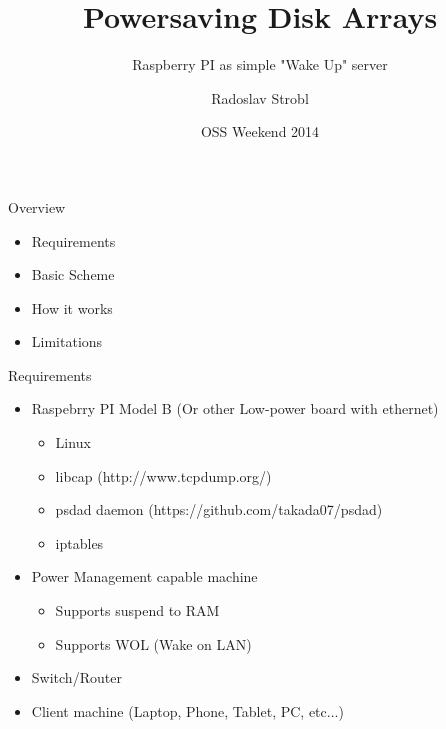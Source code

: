 \documentclass{beamer}
\title{Powersaving Disk Arrays}
\subtitle{Raspberry PI as simple "Wake Up" server}
\date[2014]{OSS Weekend 2014}
\author[R. Strobl]{Radoslav Strobl}
\begin{document}
\frame{\maketitle} %

\begin{frame}{Overview}
    \begin{itemize}
        \vfill\item Requirements
        \vfill\item Basic Scheme
        \vfill\item How it works
        \vfill\item Limitations
    \end{itemize}
\end{frame}

\begin{frame}{Requirements}
    \begin{itemize}

            \item<1-> Raspebrry PI Model B (Or other Low-power board with ethernet)
                \begin{itemize}
                    \item Linux
                    \item libcap (http://www.tcpdump.org/)
                    \item psdad daemon (https://github.com/takada07/psdad)
                    \item iptables
                \end{itemize}
            \item<2-> Power Management capable machine
                \begin{itemize}
                    \item Supports suspend to RAM
                    \item Supports WOL (Wake on LAN)
                \end{itemize}
            \item<3-> Switch/Router
            \item<4-> Client machine (Laptop, Phone, Tablet, PC, etc...)
    \end{itemize}
\end{frame}
\end{document}
